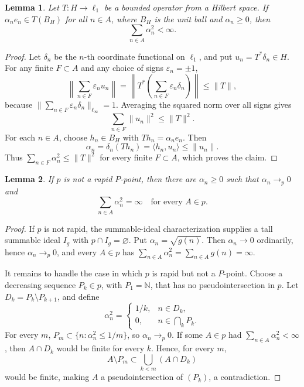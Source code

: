 \documentclass[11pt]{article}
\newtheorem{lemma}{Lemma}
\newcommand{\N}{\mathbb N}
\begin{document}
\begin{lemma}\label{lem:ellipsoid}
Let \(T:H\to\ell_1\) be a bounded operator from a Hilbert space. If
\(\alpha_n e_n\in T(B_H)\) for all \(n\in A\), where \(B_H\) is the unit ball
and \(\alpha_n\ge0\), then
\[
   \sum_{n\in A}\alpha_n^2<\infty .
\]
\end{lemma}

\begin{proof}
Let \(\delta_n\) be the \(n\)-th coordinate functional on \(\ell_1\), and put
\(u_n=T^\ast\delta_n\in H\). For any finite \(F\subset A\) and any choice of
signs \(\varepsilon_n=\pm1\),
\[
   \left\|\sum_{n\in F}\varepsilon_n u_n\right\|
   =
   \left\|T^\ast\left(\sum_{n\in F}\varepsilon_n\delta_n\right)\right\|
   \le \|T\|,
\]
because \(\|\sum_{n\in F}\varepsilon_n\delta_n\|_{\ell_\infty}=1\). Averaging
the squared norm over all signs gives
\[
   \sum_{n\in F}\|u_n\|^2\le \|T\|^2.
\]
For each \(n\in A\), choose \(h_n\in B_H\) with \(T h_n=\alpha_n e_n\). Then
\[
   \alpha_n=\delta_n(T h_n)=\langle h_n,u_n\rangle\le \|u_n\|.
\]
Thus \(\sum_{n\in F}\alpha_n^2\le\|T\|^2\) for every finite \(F\subset A\),
which proves the claim.
\end{proof}

\begin{lemma}\label{lem:badweights}
If \(p\) is not a rapid \(P\)-point, then there are \(\alpha_n\ge0\) such that
\(\alpha_n\to_p0\) and
\[
   \sum_{n\in A}\alpha_n^2=\infty
   \quad\text{for every }A\in p.
\]
\end{lemma}

\begin{proof}
If \(p\) is not rapid, the summable-ideal characterization supplies a tall
summable ideal \(I_g\) with \(p\cap I_g=\varnothing\). Put
\(\alpha_n=\sqrt{g(n)}\). Then \(\alpha_n\to0\) ordinarily, hence
\(\alpha_n\to_p0\), and every \(A\in p\) has
\(\sum_{n\in A}\alpha_n^2=\sum_{n\in A}g(n)=\infty\).

It remains to handle the case in which \(p\) is rapid but not a \(P\)-point.
Choose a decreasing sequence \(P_k\in p\), with \(P_1=\N\), that has no
pseudointersection in \(p\). Let \(D_k=P_k\setminus P_{k+1}\), and define
\[
   \alpha_n^2=
   \begin{cases}
   1/k, & n\in D_k,\\
   0, & n\in \bigcap_k P_k.
   \end{cases}
\]
For every \(m\), \(P_m\subset\{n:\alpha_n^2\le 1/m\}\), so \(\alpha_n\to_p0\).
If some \(A\in p\) had \(\sum_{n\in A}\alpha_n^2<\infty\), then
\(A\cap D_k\) would be finite for every \(k\). Hence, for every \(m\),
\[
   A\setminus P_m\subset \bigcup_{k<m}(A\cap D_k)
\]
would be finite, making \(A\) a pseudointersection of \((P_k)\), a
contradiction.
\end{proof}
\end{document}
